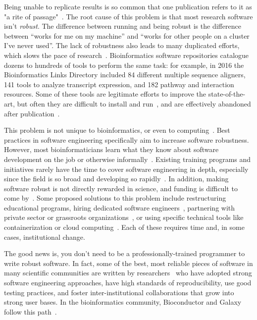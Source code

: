 \documentclass[10pt,letterpaper]{article}
\begin{document}
Being unable to
replicate results is so common that one publication refers to it as "a rite of
passage"~\cite{baker2016}. 
The root cause of this problem is that most research software
isn't \emph{robust}. The difference between running and being
robust is the difference between ``works for me on my machine'' and
``works for other people on a cluster I've never used''. The lack of
robustness also leads to many duplicated efforts,
which slows the pace of research~\cite{prabhu2011,lawlor2015}.
Bioinformatics software repositories \cite{ison2016,brazas2012} catalogue dozens to
hundreds of tools to perform the same task:
for example,
in 2016 the Bioinformatics Links Directory included 84 different multiple sequence aligners, 141 tools
to analyze transcript expression, and 182 pathway and interaction resources.
Some of these tools are legitimate efforts to improve the state-of-the-art, but
often they are difficult to install and run~\cite{stajich2002,Seemann2013}, and are effectively abandoned
after publication~\cite{nekrutenko2012}.

This problem is not unique to bioinformatics, or even to computing~\cite{baker2016}. 
Best practices in software engineering specifically aim to increase software
robustness. However, most bioinformaticians learn what they know about software development
on the job or otherwise informally~\cite{prins2015,atwood2015}.
Existing training programs and initiatives rarely have the time to cover software engineering
in depth, especially since the field is so broad and developing so rapidly~\cite{atwood2015,lawlor2015}.
In addition, making software robust is not directly rewarded
in science, and funding is difficult to come by~\cite{prins2015}. Some proposed
solutions to this problem include restructuring educational programs,
hiring dedicated software engineers~\cite{lawlor2015,sanders2008},
partnering with private sector or grassroots organizations~\cite{prins2015,ison2016},
or using specific technical tools like containerization or cloud
computing~\cite{afgan2016,howe2012}. Each of these requires time and, in some
cases, institutional change.

The good news is,
you don't need to be a professionally-trained programmer to write robust software. In fact,
some of the best, most reliable pieces of software in many scientific
communities are written by researchers~\cite{prabhu2011,sanders2008}
who have adopted strong software
engineering approaches, have high standards of reproducibility, use good testing
practices, and foster inter-institutional collaborations that grow into strong user
bases. In the bioinformatics community, Bioconductor and Galaxy follow this
path~\cite{gentleman2004,afgan2016}.
\end{document}
